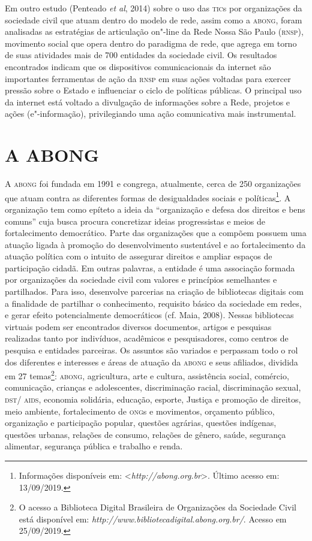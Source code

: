 Em outro estudo (Penteado \emph{et al}, 2014) sobre o uso das \textsc{tic}s por
organizações da sociedade civil que atuam dentro do modelo de rede,
assim como a \textsc{abong}, foram analisadas as estratégias de articulação
on"-line da Rede Nossa São Paulo (\textsc{rnsp}), movimento social que opera
dentro do paradigma de rede, que agrega em torno de suas atividades mais
de 700 entidades da sociedade civil. Os resultados encontrados indicam
que os dispositivos comunicacionais da internet são importantes
ferramentas de ação da \textsc{rnsp} em suas ações voltadas para exercer pressão
sobre o Estado e influenciar o ciclo de políticas públicas. O principal
uso da internet está voltado a divulgação de informações sobre a Rede,
projetos e ações (e"-informação), privilegiando uma ação comunicativa
mais instrumental.

\section{A ABONG}

A \textsc{abong} foi fundada em 1991 e congrega, atualmente, cerca de 250
organizações que atuam contra as diferentes formas de desigualdades
sociais e políticas\footnote{Informações disponíveis em:
  \textless{}\emph{http://abong.org.br}\textgreater{}.
  Último acesso em: 13/09/2019.}. A organização tem como epíteto a ideia
da ``organização e defesa dos direitos e bens comuns'' cuja busca procura
concretizar ideias progressistas e meios de fortalecimento democrático.
Parte das organizações que a compõem possuem uma atuação ligada à
promoção do desenvolvimento sustentável e ao fortalecimento da atuação
política com o intuito de assegurar direitos e ampliar espaços de
participação cidadã. Em outras palavras, a entidade é uma associação
formada por organizações da sociedade civil com valores e princípios
semelhantes e partilhados. Para isso, desenvolve parcerias na criação de
bibliotecas digitais com a finalidade de partilhar o conhecimento,
requisito básico da sociedade em redes, e gerar efeito potencialmente
democráticos (cf. Maia, 2008). Nessas bibliotecas virtuais podem ser
encontrados diversos documentos, artigos e pesquisas realizadas tanto
por indivíduos, acadêmicos e pesquisadores, como centros de pesquisa e
entidades parceiras. Os assuntos são variados e perpassam todo o rol dos
diferentes e interesses e áreas de atuação da \textsc{abong} e seus afiliados,
dividida em 27 temas\footnote{O acesso a Biblioteca Digital Brasileira
  de Organizações da Sociedade Civil está disponível em:
  \emph{http://www.bibliotecadigital.abong.org.br/}.
  Acesso em 25/09/2019.}: \textsc{abong}, agricultura, arte e cultura,
assistência social, comércio, comunicação, crianças e adolescentes,
discriminação racial, discriminação sexual, \textsc{dst}/ \textsc{aids}, economia
solidária, educação, esporte, Justiça e promoção de direitos, meio
ambiente, fortalecimento de \textsc{ong}s e movimentos, orçamento público,
organização e participação popular, questões agrárias, questões
indígenas, questões urbanas, relações de consumo, relações de gênero,
saúde, segurança alimentar, segurança pública e trabalho e renda.

